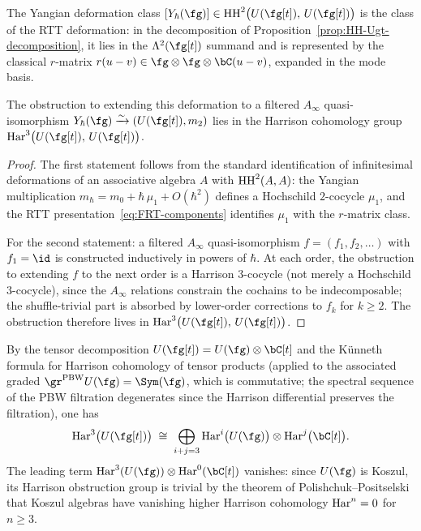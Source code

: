 \begin{proposition}
\label{prop:yangian-deformation-obstruction}
The Yangian deformation class
$[Y_\hbar(\fg)] \in \HH^2\bigl(U(\fg[t]),\, U(\fg[t])\bigr)$
is the class of the RTT deformation: in the decomposition of
Proposition~\textup{\ref{prop:HH-Ugt-decomposition}}, it
lies in the $\Lambda^2(\fg[t])$ summand and is represented by
the classical $r$-matrix $r(u-v) \in \fg \otimes \fg \otimes
\bC(u-v)$, expanded in the mode basis.

The obstruction to extending this deformation to a filtered
$A_\infty$ quasi-isomorphism
$Y_\hbar(\fg) \xrightarrow{\sim} (U(\fg[t]), m_2)$ lies in
the Harrison cohomology group
$\Har^3\bigl(U(\fg[t]),\, U(\fg[t])\bigr)$.
\end{proposition}

\begin{proof}
The first statement follows from the standard identification
of infinitesimal deformations of an associative algebra $A$
with $\operatorname{HH}^2(A,A)$: the Yangian multiplication
$m_\hbar = m_0 + \hbar\, \mu_1 + O(\hbar^2)$ defines a
Hochschild $2$-cocycle $\mu_1$, and the RTT
presentation~\eqref{eq:FRT-components} identifies $\mu_1$
with the $r$-matrix class.

For the second statement: a filtered $A_\infty$
quasi-isomorphism $f = (f_1, f_2, \ldots)$ with $f_1 = \id$
is constructed inductively in powers of $\hbar$. At each
order, the obstruction to extending $f$ to the next order is
a Harrison $3$-cocycle (not merely a Hochschild $3$-cocycle),
since the $A_\infty$ relations constrain the cochains to be
indecomposable; the shuffle-trivial part is absorbed by
lower-order corrections to $f_k$ for $k \ge 2$.
The obstruction therefore lives in
$\Har^3\bigl(U(\fg[t]),\, U(\fg[t])\bigr)$.
\end{proof}

\begin{lemma}
\label{lem:harrison-leading-vanishing}
By the tensor decomposition
$U(\fg[t]) = U(\fg) \otimes \bC[t]$ and the K\"unneth
formula for Harrison cohomology of tensor products
\textup{(}applied to the associated graded
$\gr^{\mathrm{PBW}} U(\fg) = \Sym(\fg)$, which is
commutative; the spectral sequence of the PBW filtration
degenerates since the Harrison differential preserves the
filtration\textup{)}, one has
\begin{equation}
\label{eq:harrison-kunneth}
 \Har^3\bigl(U(\fg[t])\bigr)
 \;\cong\;
 \bigoplus_{i+j=3}
 \Har^i\bigl(U(\fg)\bigr) \otimes
 \Har^j\bigl(\bC[t]\bigr).
\end{equation}
The leading term $\Har^3(U(\fg)) \otimes \Har^0(\bC[t])$
vanishes: since $U(\fg)$ is Koszul, its Harrison obstruction
group is trivial by the theorem of Polishchuk--Positselski
\textup{\cite{polishchuk2005quadratic}} that Koszul algebras
have vanishing higher Harrison cohomology
$\operatorname{Har}^n = 0$ for $n \ge 3$.
\end{lemma}

